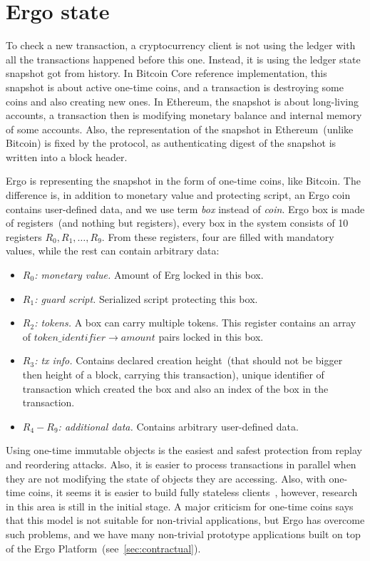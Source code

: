 \section{Ergo state}
\label{sec:utxo}

To check a new transaction, a cryptocurrency client is not using the ledger with all the transactions happened before this
one. Instead, it is using the ledger state snapshot got from history. In Bitcoin Core reference implementation,
this snapshot is about active one-time coins, and a transaction is destroying some coins and also creating new ones.
In Ethereum, the snapshot is about long-living accounts, a transaction then is modifying monetary balance and internal memory of some accounts. Also, the
representation of the snapshot in Ethereum~(unlike Bitcoin) is fixed by the protocol, as authenticating digest of the
snapshot is written into a block header.

Ergo is representing the snapshot in the form of one-time coins, like Bitcoin. The difference is, in addition to monetary
value and protecting script, an Ergo coin contains user-defined data, and we use term {\em box} instead of {\em coin}.
Ergo box is made of registers~(and nothing but registers), every box in the system consists of 10 registers $R_0,R_1,\ldots,R_9$.
From these registers, four are filled with mandatory values, while the rest can contain arbitrary data:


\begin{itemize}
    \item{\em $R_0$: monetary value. } Amount of Erg locked in this box.
    \item{\em $R_1$: guard script. } Serialized script protecting this box.
    \item{\em $R_2$: tokens. } A box can carry multiple tokens. This register contains an array of
    $token\_identifier \rightarrow amount$ pairs locked in this box.
    \item{\em $R_3$: tx info. } Contains declared creation height~(that should not be bigger then height of a block, carrying this transaction),
    unique identifier of transaction which created the box and also an index of the box in the transaction.
    \item{\em $R_4-R_9$: additional data. } Contains arbitrary user-defined data.
\end{itemize}


Using one-time immutable objects is the easiest and safest protection from replay and reordering attacks.
Also, it is easier to process transactions in parallel when they are not modifying the state of objects they
are accessing.
Also, with one-time coins, it seems it is easier to build fully stateless clients~\cite{chepurnoy2018edrax},
however, research in this area is still in the initial stage.
A major criticism for one-time coins says that this model is not suitable for non-trivial applications,
but Ergo has overcome such problems, and we have many non-trivial prototype applications built on top of
the Ergo Platform~(see~\ref{sec:contractual}).

